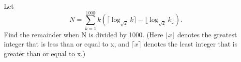 Let \[N= \sum_{k=1}^{1000}k(\lceil \log_{\sqrt{2}}k\rceil-\lfloor \log_{\sqrt{2}}k \rfloor).\] Find the remainder when N is divided by 1000.  (Here $\lfloor x \rfloor$ denotes the greatest integer that is less than or equal to x, and $\lceil x \rceil$ denotes the least integer that is greater than or equal to x.)